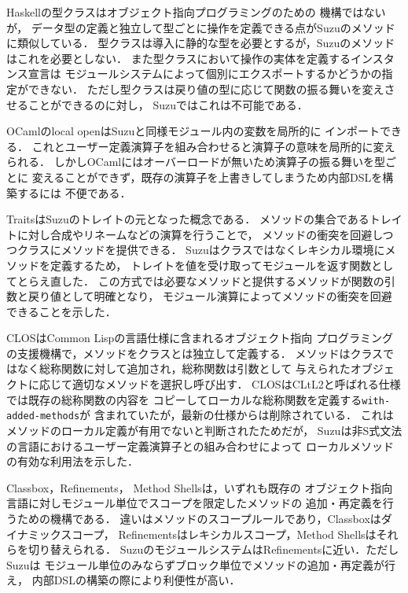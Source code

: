 \documentclass[a4paper,11pt,dvipdfmx]{jreport}
\begin{document}
Haskellの型クラス\cite{TypeClasses}はオブジェクト指向プログラミングのための
機構ではないが，
データ型の定義と独立して型ごとに操作を定義できる点がSuzuのメソッドに類似している．
型クラスは導入に静的な型を必要とするが，Suzuのメソッドはこれを必要としない．
また型クラスにおいて操作の実体を定義するインスタンス宣言は
モジュールシステムによって個別にエクスポートするかどうかの指定ができない．
ただし型クラスは戻り値の型に応じて関数の振る舞いを変えさせることができるのに対し，
Suzuではこれは不可能である．

OCaml\cite{OCaml}のlocal openはSuzuと同様モジュール内の変数を局所的に
インポートできる．
これとユーザー定義演算子を組み合わせると演算子の意味を局所的に変えられる．
しかしOCamlにはオーバーロードが無いため演算子の振る舞いを型ごとに
変えることができず，既存の演算子を上書きしてしまうため内部DSLを構築するには
不便である．

Traits\cite{Traits,ApplyingTraits}はSuzuのトレイトの元となった概念である．
メソッドの集合であるトレイトに対し合成やリネームなどの演算を行うことで，
メソッドの衝突を回避しつつクラスにメソッドを提供できる．
Suzuはクラスではなくレキシカル環境にメソッドを定義するため，
トレイトを値を受け取ってモジュールを返す関数としてとらえ直した．
この方式では必要なメソッドと提供するメソッドが関数の引数と戻り値として明確となり，
モジュール演算によってメソッドの衝突を回避できることを示した．

CLOS\cite{CLOS}はCommon Lispの言語仕様に含まれるオブジェクト指向
プログラミングの支援機構で，メソッドをクラスとは独立して定義する．
メソッドはクラスではなく総称関数に対して追加され，総称関数は引数として
与えられたオブジェクトに応じて適切なメソッドを選択し呼び出す．
CLOSはCLtL2\cite{CLtL2}と呼ばれる仕様では既存の総称関数の内容を
コピーしてローカルな総称関数を定義する\verb|with-added-methods|が
含まれていたが，最新の仕様からは削除されている．
これはメソッドのローカル定義が有用でないと判断されたためだが，
Suzuは非S式文法の言語におけるユーザー定義演算子との組み合わせによって
ローカルメソッドの有効な利用法を示した．

Classbox\cite{Classboxes}，Refinements\cite{Refinements}，
Method Shells\cite{MethodShells}は，いずれも既存の
オブジェクト指向言語に対しモジュール単位でスコープを限定したメソッドの
追加・再定義を行うための機構である．
違いはメソッドのスコープルールであり，Classboxはダイナミックスコープ，
Refinementsはレキシカルスコープ，Method Shellsはそれらを切り替えられる．
SuzuのモジュールシステムはRefinementsに近い．ただしSuzuは
モジュール単位のみならずブロック単位でメソッドの追加・再定義が行え，
内部DSLの構築の際により利便性が高い．
\end{document}
